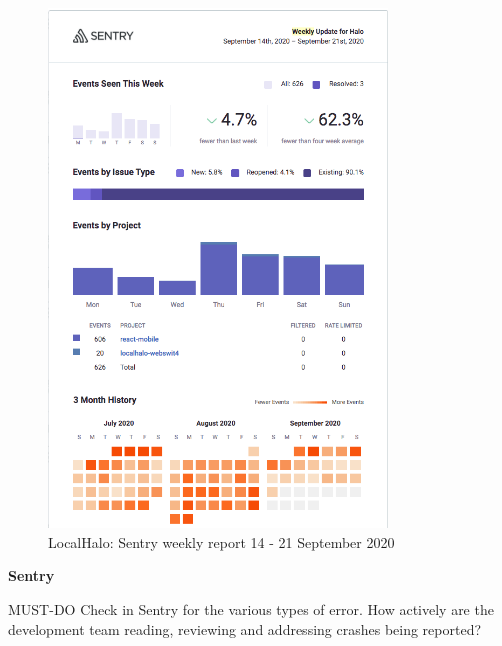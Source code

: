 \begin{figure}[htbp!]
    \centering
    \includegraphics[width=9cm]{images/localhalo/sentry-weekly-report-21-Sep-2020.png}
    \caption{LocalHalo: Sentry weekly report 14 - 21 September 2020}
    \label{fig:localhalo-sentry-weekly-report-21-sep-2020}
\end{figure}

\textbf{Sentry}

MUST-DO Check in Sentry for the various types of error. How actively are the development team reading, reviewing and addressing crashes being reported? 

